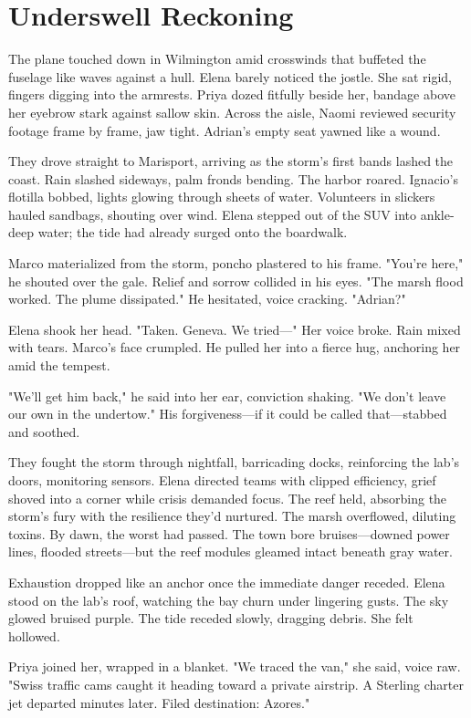 \chapter{Underswell Reckoning}

The plane touched down in Wilmington amid crosswinds that buffeted the fuselage like waves against a hull. Elena barely noticed the jostle. She sat rigid, fingers digging into the armrests. Priya dozed fitfully beside her, bandage above her eyebrow stark against sallow skin. Across the aisle, Naomi reviewed security footage frame by frame, jaw tight. Adrian's empty seat yawned like a wound.

They drove straight to Marisport, arriving as the storm's first bands lashed the coast. Rain slashed sideways, palm fronds bending. The harbor roared. Ignacio's flotilla bobbed, lights glowing through sheets of water. Volunteers in slickers hauled sandbags, shouting over wind. Elena stepped out of the SUV into ankle-deep water; the tide had already surged onto the boardwalk.

Marco materialized from the storm, poncho plastered to his frame. "You're here," he shouted over the gale. Relief and sorrow collided in his eyes. "The marsh flood worked. The plume dissipated." He hesitated, voice cracking. "Adrian?"

Elena shook her head. "Taken. Geneva. We tried—" Her voice broke. Rain mixed with tears. Marco's face crumpled. He pulled her into a fierce hug, anchoring her amid the tempest.

"We'll get him back," he said into her ear, conviction shaking. "We don't leave our own in the undertow." His forgiveness—if it could be called that—stabbed and soothed.

They fought the storm through nightfall, barricading docks, reinforcing the lab's doors, monitoring sensors. Elena directed teams with clipped efficiency, grief shoved into a corner while crisis demanded focus. The reef held, absorbing the storm's fury with the resilience they'd nurtured. The marsh overflowed, diluting toxins. By dawn, the worst had passed. The town bore bruises—downed power lines, flooded streets—but the reef modules gleamed intact beneath gray water.

Exhaustion dropped like an anchor once the immediate danger receded. Elena stood on the lab's roof, watching the bay churn under lingering gusts. The sky glowed bruised purple. The tide receded slowly, dragging debris. She felt hollowed.

Priya joined her, wrapped in a blanket. "We traced the van," she said, voice raw. "Swiss traffic cams caught it heading toward a private airstrip. A Sterling charter jet departed minutes later. Filed destination: Azores."

